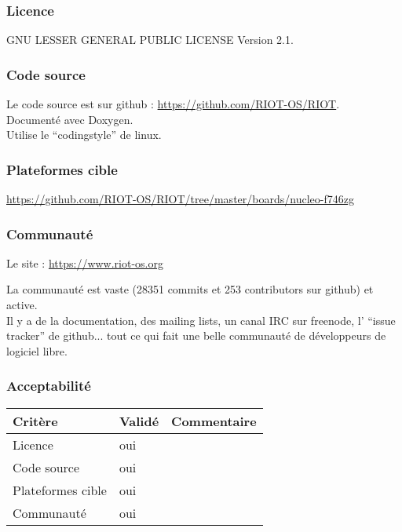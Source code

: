 \subsubsection{Licence}
GNU LESSER GENERAL PUBLIC LICENSE Version 2.1.

\subsubsection{Code source}
Le code source est sur github : \url{https://github.com/RIOT-OS/RIOT}.\\

Documenté avec Doxygen.\\

Utilise le \enquote{codingstyle} de linux.


\subsubsection{Plateformes cible}
\url{https://github.com/RIOT-OS/RIOT/tree/master/boards/nucleo-f746zg}

\subsubsection{Communauté}
Le site : \url{https://www.riot-os.org}

La communauté est vaste (28351 commits et 253 contributors sur github) et active.\\

Il y a de la documentation, des mailing lists, un canal IRC sur freenode, l'
\enquote{issue tracker} de github... tout ce qui fait une belle communauté de
développeurs de logiciel libre.

\subsubsection{Acceptabilité}
\begin{tabular}{lll}
\toprule
	Critère				&	Validé		&	Commentaire	\\
\midrule
	Licence				&	oui			&		\\
	Code source			&	oui			&		\\
	Plateformes cible	&	oui			&		\\
	Communauté			&	oui			&		\\
\bottomrule
\end{tabular}

